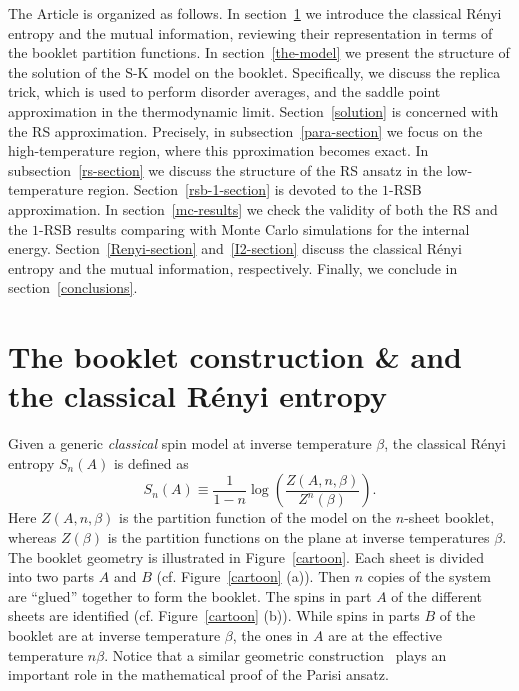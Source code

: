 \documentclass[twocolumn,superscriptaddress,prb,10pt]{revtex4-1}
\begin{document}
The Article is organized as follows. In section~\ref{booklet} we introduce the classical 
R\'enyi entropy and the mutual information, reviewing their representation in terms of 
the booklet partition functions. In section~\ref{the-model} we present the structure of 
the solution of the S-K model on the booklet. Specifically, we discuss the replica 
trick, which is used to perform disorder averages, and the saddle point approximation in 
the thermodynamic limit. Section~\ref{solution} is concerned with the RS approximation. 
Precisely, in subsection~\ref{para-section} we focus on the high-temperature 
region, where this pproximation becomes exact. In subsection~\ref{rs-section} we discuss 
the structure of the RS ansatz in the low-temperature region. Section~\ref{rsb-1-section} 
is devoted to   the $1$-RSB approximation. In section~\ref{mc-results} we check the validity 
of both the RS and the $1$-RSB results comparing with Monte Carlo simulations for the 
internal energy. Section~\ref{Renyi-section} and~\ref{I2-section} discuss the classical R\'enyi 
entropy and the mutual information, respectively. Finally, we conclude in section~\ref{conclusions}.



\section{The booklet construction \& and the classical R\'enyi entropy}
\label{booklet}

Given a generic \emph{classical} spin model at inverse temperature $\beta$, 
the classical R\'enyi entropy $S_n(A)$ is defined as~\cite{jaconis-2013,stephan-2014} 
%
\begin{equation}
\label{renyi}
S_n(A)\equiv \frac{1}{1-n}\log\left(\frac{Z(A,n,\beta)}{Z^n(\beta)}\right).
\end{equation}
%
Here $Z(A,n,\beta)$ is the partition function of the model on the $n$-sheet booklet, 
whereas $Z(\beta)$ is the partition functions on the plane at inverse temperatures $\beta$. 
The booklet geometry is illustrated in Figure~\ref{cartoon}. 
Each sheet is divided into two parts $A$ and $B$ (cf. Figure~\ref{cartoon} (a)). Then $n$ copies 
of the system are ``glued'' together to form the booklet. The spins in part $A$ of the different 
sheets are identified (cf. Figure~\ref{cartoon} (b)). While spins in parts $B$ of the booklet 
are at inverse temperature $\beta$, the ones in $A$ are at the effective temperature $n\beta$. 
Notice that a similar geometric construction~\cite{guerra-2002} plays an important role in the 
mathematical proof of the Parisi ansatz. 
\end{document}
